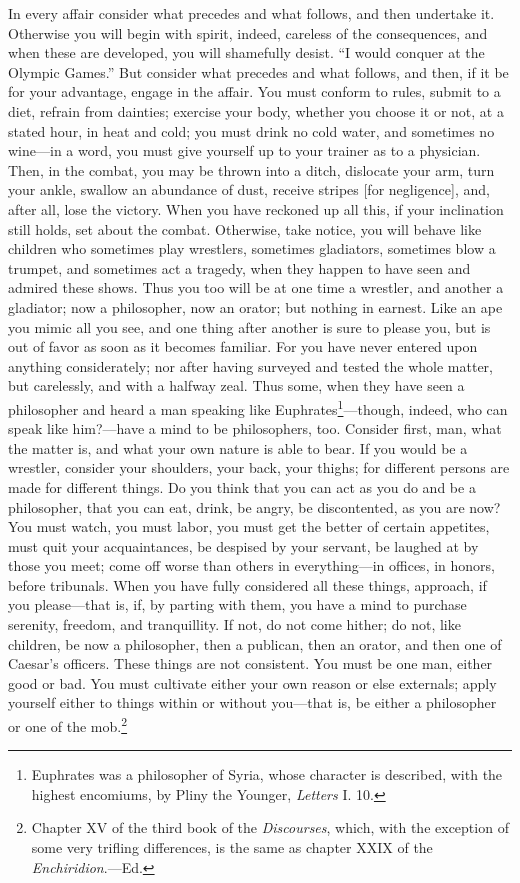 In every affair consider what precedes and what follows, and then
undertake it. Otherwise you will begin with spirit, indeed, careless of
the consequences, and when these are developed, you will shamefully
desist. ``I would conquer at the Olympic Games.'' But consider what
precedes and what follows, and then, if it be for your advantage, engage
in the affair. You must conform to rules, submit to a diet, refrain from
dainties; exercise your body, whether you choose it or not, at a stated
hour, in heat and cold; you must drink no cold water, and sometimes no
wine---in a word, you must give yourself up to your trainer as to a
physician. Then, in the combat, you may be thrown into a ditch, dislocate
your arm, turn your ankle, swallow an abundance of dust, receive stripes
[for negligence], and, after all, lose the victory. When you have
reckoned up all this, if your inclination still holds, set about the
combat. Otherwise, take notice, you will behave like children who
sometimes play wrestlers, sometimes gladiators, sometimes blow a trumpet,
and sometimes act a tragedy, when they happen to have seen and admired
these shows. Thus you too will be at one time a wrestler, and another a
gladiator; now a philosopher, now an orator; but nothing in earnest. Like
an ape you mimic all you see, and one thing after another is sure to
please you, but is out of favor as soon as it becomes familiar. For you
have never entered upon anything considerately; nor after having surveyed
and tested the whole matter, but carelessly, and with a halfway zeal.
Thus some, when they have seen a philosopher and heard a man speaking
like Euphrates\footnote{Euphrates was a philosopher of Syria, whose character is described,
with the highest encomiums, by Pliny the Younger, \emph{Letters} I. 10.}---though, indeed, who can speak like him?---have a mind to
be philosophers, too. Consider first, man, what the matter is, and what
your own nature is able to bear. If you would be a wrestler, consider
your shoulders, your back, your thighs; for different persons are made
for different things. Do you think that you can act as you do and be a
philosopher, that you can eat, drink, be angry, be discontented, as you
are now? You must watch, you must labor, you must get the better of
certain appetites, must quit your acquaintances, be despised by your
servant, be laughed at by those you meet; come off worse than others in
everything---in offices, in honors, before tribunals. When you have fully
considered all these things, approach, if you please---that is, if, by
parting with them, you have a mind to purchase serenity, freedom, and
tranquillity. If not, do not come hither; do not, like children, be now a
philosopher, then a publican, then an orator, and then one of Caesar's
officers. These things are not consistent. You must be one man, either
good or bad. You must cultivate either your own reason or else externals;
apply yourself either to things within or without you---that is, be either
a philosopher or one of the mob.\footnote{Chapter XV of the third book of the \emph{Discourses}, which, with the
exception of some very trifling differences, is the same as chapter
XXIX of the \emph{Enchiridion}.---Ed.}

